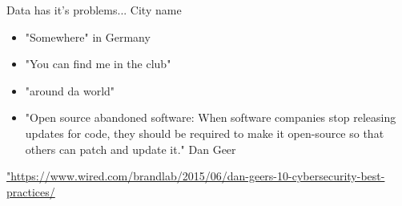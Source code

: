 
\begin{frame}{Data has it's problems... City name }

\begin{itemize}
\item "Somewhere" in Germany
\item "You can find me in the club"
\item "around da world"


\pause     

    \item "Open source abandoned software: When software companies stop releasing updates for code, they should be required to make it open-source so that others can patch and update it." Dan Geer
    
\end{itemize}
\footnotesize \url{"https://www.wired.com/brandlab/2015/06/dan-geers-10-cybersecurity-best-practices/}
    
\end{frame}


